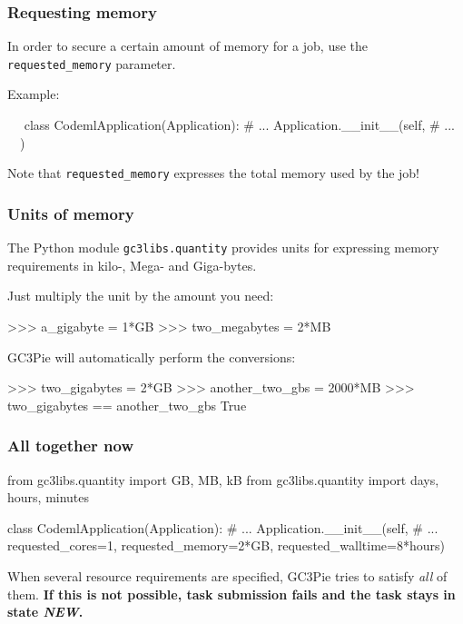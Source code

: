 \documentclass[english,serif,mathserif,xcolor=pdftex,dvipsnames,table]{beamer}
\begin{document}




\begin{frame}[fragile]
  \frametitle{Requesting memory}
  In order to secure a certain amount of memory for a job, use the
  \lstinline|requested_memory| parameter.

  \+
  Example:
\begin{python}
  ~~
  class CodemlApplication(Application):
    # ...
    Application.__init__(self,
      # ...
      ~~)
\end{python}

  \+
  Note that \lstinline|requested_memory| expresses the total
  memory used by the job!
\end{frame}

\begin{frame}[fragile]
  \frametitle{Units of memory}
  The Python module \texttt{gc3libs.quantity} provides units for
  expressing memory requirements in kilo-, Mega- and Giga-bytes.

  \+
  Just multiply the unit by the amount you need:
\begin{python}
  >>> a_gigabyte = 1*GB
  >>> two_megabytes = 2*MB
\end{python}

  \+
  GC3Pie will automatically perform the conversions:
  \begin{python}
    >>> two_gigabytes = 2*GB
    >>> another_two_gbs = 2000*MB
    >>> two_gigabytes == another_two_gbs
    True
  \end{python}
\end{frame}


\begin{frame}[fragile]
  \frametitle{All together now}

\begin{python}
from gc3libs.quantity import GB, MB, kB
from gc3libs.quantity import days, hours, minutes

class CodemlApplication(Application):
  # ...
  Application.__init__(self,
    # ...
    requested_cores=1,
    requested_memory=2*GB,
    requested_walltime=8*hours)
\end{python}

  \+ When several resource requirements are specified, GC3Pie tries to
  satisfy \emph{all} of them.  \textbf{If this is not possible, task
  submission fails and the task stays in state \emph{NEW}.}

\end{frame}
\end{document}

